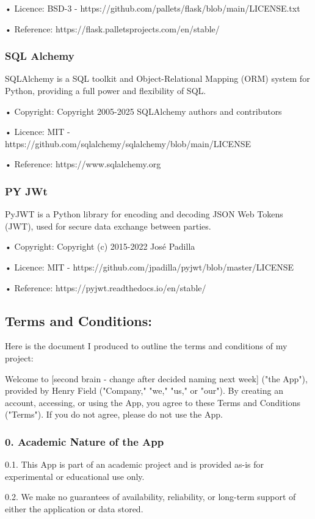 • Licence: BSD-3 -  https://github.com/pallets/flask/blob/main/LICENSE.txt

• Reference:  https://flask.palletsprojects.com/en/stable/

\subsubsection{SQL Alchemy}
SQLAlchemy is a SQL toolkit and Object-Relational Mapping (ORM) system for Python, providing a full power and flexibility of SQL.

• Copyright: Copyright 2005-2025 SQLAlchemy authors and contributors

• Licence: MIT -  https://github.com/sqlalchemy/sqlalchemy/blob/main/LICENSE

• Reference:  https://www.sqlalchemy.org

\subsubsection{PY JWt}
PyJWT is a Python library for encoding and decoding JSON Web Tokens (JWT), used for secure data exchange between parties.

• Copyright: Copyright (c) 2015-2022 José Padilla

• Licence: MIT -  https://github.com/jpadilla/pyjwt/blob/master/LICENSE

• Reference:  https://pyjwt.readthedocs.io/en/stable/


\subsection*{Terms and Conditions:}
Here is the document I produced to outline the terms and conditions of my project:

Welcome to [second brain - change after decided naming next week] ("the App"), provided by Henry Field ("Company," "we," "us," or "our"). By creating an account, accessing, or using the App, you agree to these Terms and Conditions ("Terms"). If you do not agree, please do not use the App.

\subsubsection*{0. Academic Nature of the App}

0.1. This App is part of an academic project and is provided as-is for experimental or educational use only.

0.2. We make no guarantees of availability, reliability, or long-term support of either the application or data stored.

